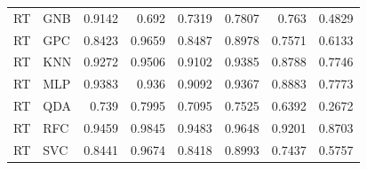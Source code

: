 \begin{tabular}{llrrrrrr}
RT & GNB & 0.9142 & 0.692 & 0.7319 & 0.7807 & 0.763 & 0.4829 \\
RT & GPC & 0.8423 & 0.9659 & 0.8487 & 0.8978 & 0.7571 & 0.6133 \\
RT & KNN & 0.9272 & 0.9506 & 0.9102 & 0.9385 & 0.8788 & 0.7746 \\
RT & MLP & 0.9383 & 0.936 & 0.9092 & 0.9367 & 0.8883 & 0.7773 \\
RT & QDA & 0.739 & 0.7995 & 0.7095 & 0.7525 & 0.6392 & 0.2672 \\
RT & RFC & 0.9459 & 0.9845 & 0.9483 & 0.9648 & 0.9201 & 0.8703 \\
RT & SVC & 0.8441 & 0.9674 & 0.8418 & 0.8993 & 0.7437 & 0.5757 \\
\bottomrule
\end{tabular}
